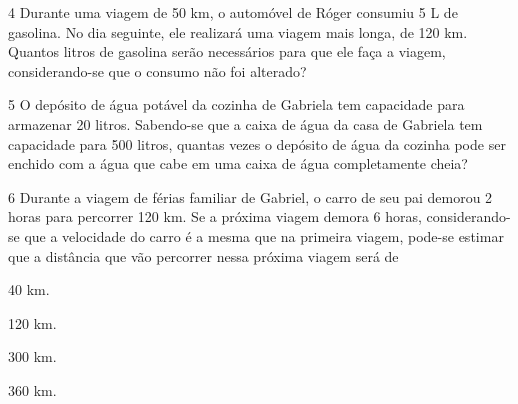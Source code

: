 \begin{mdframed}[linewidth=2pt,linecolor=salmao,roundcorner=2pt]
\begin{escolha}
{\begin{escolha}
\begin{mdframed}[linewidth=2pt,linecolor=salmao,roundcorner=2pt]
\vspace{2cm}
\end{mdframed}

\num{4} Durante uma viagem de 50 km, o automóvel de Róger consumiu 5 L de
gasolina. No dia seguinte, ele realizará uma viagem mais longa, de 120 km.
Quantos litros de gasolina serão necessários para que ele faça a viagem,
considerando-se que o consumo não foi alterado?

\begin{mdframed}[linewidth=2pt,linecolor=salmao,roundcorner=2pt]

\vspace{2cm}
\end{mdframed}



\num{5} O depósito de água potável da cozinha de Gabriela tem capacidade para
armazenar 20 litros. Sabendo-se que a caixa de água da casa de Gabriela
tem capacidade para 500 litros, quantas vezes o depósito de água da
cozinha pode ser enchido com a água que cabe em uma caixa de água
completamente cheia?

\begin{mdframed}[linewidth=2pt,linecolor=salmao,roundcorner=2pt]
\vspace{2cm}
\end{mdframed}


\num{6} Durante a viagem de férias familiar de Gabriel, o carro de seu pai
demorou 2 horas para percorrer 120 km. Se a próxima viagem demora 6
horas, considerando-se que a velocidade do carro é a mesma que na primeira
viagem, pode-se estimar que a distância que vão percorrer nessa próxima
viagem será de

\begin{escolha}
\item
  40 km.
\item
  120 km.
\item
  300 km.
\item
  360 km.
\end{escolha}


\end{escolha}}
\end{escolha}
\end{mdframed}
